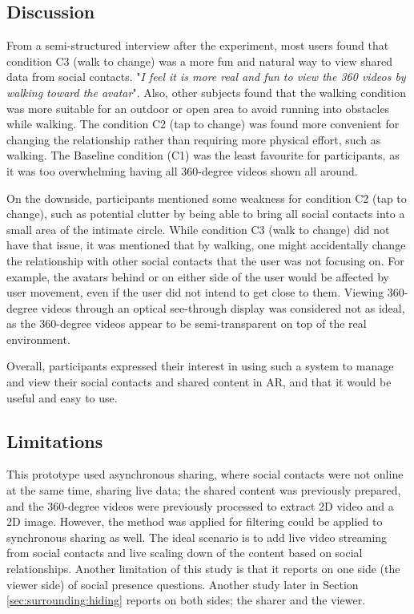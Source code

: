 \subsection{Discussion}

From a semi-structured interview after the experiment, most users found that condition C3 (walk to change) was a more fun and natural way to view shared data from social contacts. "\textit{I feel it is more real and fun to view the 360 videos by walking toward the avatar}". Also, other subjects found that the walking condition was more suitable for an outdoor or open area to avoid running into obstacles while walking. The condition C2 (tap to change) was found more convenient for changing the relationship rather than requiring more physical effort, such as walking. The Baseline condition (C1) was the least favourite for participants, as it was too overwhelming having all 360-degree videos shown all around. 

On the downside, participants mentioned some weakness for condition C2 (tap to change), such as potential clutter by being able to bring all social contacts into a small area of the intimate circle. While condition C3 (walk to change) did not have that issue, it was mentioned that by walking, one might accidentally change the relationship with other social contacts that the user was not focusing on. For example, the avatars behind or on either side of the user would be affected by user movement, even if the user did not intend to get close to them. Viewing 360-degree videos through an optical see-through display was considered not as ideal, as the 360-degree videos appear to be semi-transparent on top of the real environment.

Overall, participants expressed their interest in using such a system to manage and view their social contacts and shared content in AR, and that it would be useful and easy to use. 

\subsection{Limitations}

This prototype used asynchronous sharing, where social contacts were not online at the same time, sharing live data; the shared content was previously prepared, and the 360-degree videos were previously processed to extract 2D video and a 2D image. However, the method was applied for filtering could be applied to synchronous sharing as well. The ideal scenario is to add live video streaming from social contacts and live scaling down of the content based on social relationships. Another limitation of this study is that it reports on one side (the viewer side) of social presence questions. Another study later in Section \ref{sec:surrounding:hiding} reports on both sides; the sharer and the viewer. 

